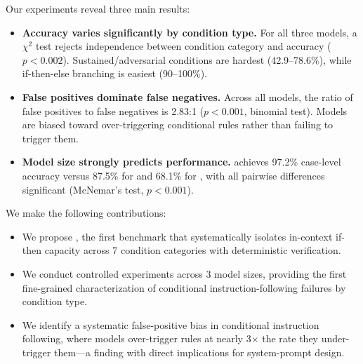  Our experiments reveal three main results:
\begin{itemize}[leftmargin=*,itemsep=0pt,topsep=0pt]
    \item \textbf{Accuracy varies significantly by condition type.} For all three models, a $\chi^2$ test rejects independence between condition category and accuracy ($p < 0.002$). Sustained/adversarial conditions are hardest (42.9--78.6\%), while if-then-else branching is easiest (90--100\%).
    \item \textbf{False positives dominate false negatives.} Across all models, the ratio of false positives to false negatives is 2.83:1 ($p < 0.001$, binomial test). Models are biased toward over-triggering conditional rules rather than failing to trigger them.
    \item \textbf{Model size strongly predicts performance.} \gptlarge achieves 97.2\% case-level accuracy versus 87.5\% for \gptmini and 68.1\% for \gptnano, with all pairwise differences significant (McNemar's test, $p < 0.001$).
\end{itemize}

 We make the following contributions:
\begin{itemize}[leftmargin=*,itemsep=0pt,topsep=0pt]
    \item We propose \benchname, the first benchmark that systematically isolates in-context if-then capacity across 7 condition categories with deterministic verification.
    \item We conduct controlled experiments across 3 model sizes, providing the first fine-grained characterization of conditional instruction-following failures by condition type.
    \item We identify a systematic false-positive bias in conditional instruction following, where models over-trigger rules at nearly 3$\times$ the rate they under-trigger them---a finding with direct implications for system-prompt design.
\end{itemize}
